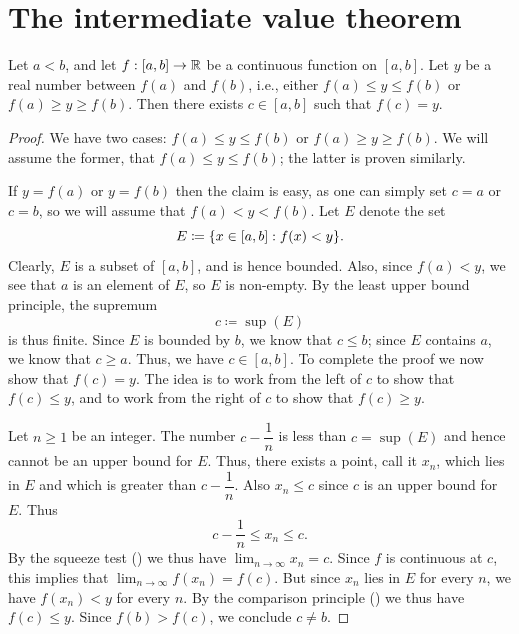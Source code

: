 \section{The intermediate value theorem}\label{i:sec:9.7}

\begin{thm}\label{i:9.7.1}
  Let \(a < b\), and let \(f : [a, b] \to \mathbb{R}\) be a continuous function on \([a, b]\).
  Let \(y\) be a real number between \(f(a)\) and \(f(b)\), i.e., either \(f(a) \leq y \leq f(b)\) or \(f(a) \geq y \geq f(b)\).
  Then there exists \(c \in [a, b]\) such that \(f(c) = y\).
\end{thm}

\begin{proof}
  We have two cases: \(f(a) \leq y \leq f(b)\) or \(f(a) \geq y \geq f(b)\).
  We will assume the former, that \(f(a) \leq y \leq f(b)\);
  the latter is proven similarly.

  If \(y = f(a)\) or \(y = f(b)\) then the claim is easy, as one can simply set \(c = a\) or \(c = b\), so we will assume that \(f(a) < y < f(b)\).
  Let \(E\) denote the set
  \[
    E \coloneqq \set{x \in [a, b] : f(x) < y}.
  \]
  Clearly, \(E\) is a subset of \([a, b]\), and is hence bounded.
  Also, since \(f(a) < y\), we see that \(a\) is an element of \(E\), so \(E\) is non-empty.
  By the least upper bound principle, the supremum
  \[
    c \coloneqq \sup(E)
  \]
  is thus finite.
  Since \(E\) is bounded by \(b\), we know that \(c \leq b\);
  since \(E\) contains \(a\), we know that \(c \geq a\).
  Thus, we have \(c \in [a, b]\).
  To complete the proof we now show that \(f(c) = y\).
  The idea is to work from the left of \(c\) to show that \(f(c) \leq y\), and to work from the right of \(c\) to show that \(f(c) \geq y\).

  Let \(n \geq 1\) be an integer.
  The number \(c - \dfrac{1}{n}\) is less than \(c = \sup(E)\) and hence cannot be an upper bound for \(E\).
  Thus, there exists a point, call it \(x_n\), which lies in \(E\) and which is greater than \(c - \dfrac{1}{n}\).
  Also \(x_n \leq c\) since \(c\) is an upper bound for \(E\).
  Thus
  \[
    c - \dfrac{1}{n} \leq x_n \leq c.
  \]
  By the squeeze test () we thus have \(\lim_{n \to \infty} x_n = c\).
  Since \(f\) is continuous at \(c\), this implies that \(\lim_{n \to \infty} f(x_n) = f(c)\).
  But since \(x_n\) lies in \(E\) for every \(n\), we have \(f(x_n) < y\) for every \(n\).
  By the comparison principle () we thus have \(f(c) \leq y\).
  Since \(f(b) > f(c)\), we conclude \(c \neq b\).


\end{proof}
